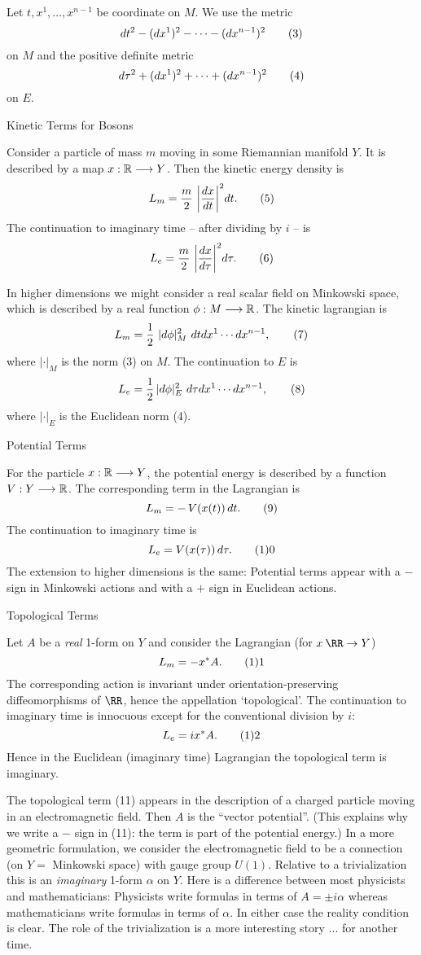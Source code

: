 Let $t,x^1,\ldots,x^{n-1}$ be coordinate on $M$.  We use the
metric
$$
dt^2-(dx^1)^2-\cdots-(dx^{n-1})^2\tag3
$$
on $M$ and the positive definite metric
$$
d\tau^2+(dx^1)^2+\cdots+(dx^{n-1})^2\tag4
$$
on $E$.
 
\subhead Kinetic Terms for Bosons\endsubhead
 
Consider a particle of mass $m$ moving in some Riemannian
manifold $Y$.  It is described by a map $x:\Bbb
R\longrightarrow Y$.  Then the kinetic energy density is
$$
L_m=\frac{m}{2}\,\,\bigg\vert\frac{dx}{dt}\bigg\vert^2dt.\tag5
$$
The continuation to imaginary time -- after dividing by
$i$ -- is 
$$
L_e=\frac{m}{2}\,\,\bigg\vert\frac{dx}{d\tau}
\bigg\vert^2d\tau.\tag6
$$
 
In higher dimensions we might consider a real scalar field
on Minkowski space, which is described by a real function
$\phi:M\longrightarrow\Bbb R$.  The kinetic lagrangian is 
$$
L_m=\frac{1}{2}\,\,|d\phi|^2_M\,\,dtdx^1\cdots
dx^{n-1},\tag7
$$
where $|\cdot|_M$ is the norm (3) on $M$.  The
continuation to $E$ is
$$
L_e=\frac{1}{2}\,|d\phi|^2_E\,\,d\tau dx^1\cdots
dx^{n-1},\tag8
$$
where $|\cdot|_E$ is the Euclidean norm (4).
 
\subhead Potential Terms\endsubhead
 
For the particle $x:\Bbb R\longrightarrow Y$, the potential
energy is described by a function $V:Y\longrightarrow\Bbb
R$.  The corresponding term in the Lagrangian is
$$
L_m=-\,V(x(t))\,dt.\tag9
$$
The continuation to imaginary time is
$$
L_e=V(x(\tau))\,d\tau.\tag10
$$
The extension to higher dimensions is the same:  Potential
terms appear with a $-$ sign in Minkowski actions and
with a $+$ sign in Euclidean actions.
 
\subhead Topological Terms\endsubhead
 
Let $A$ be a {\it real} 1-form on $Y$ and consider the
Lagrangian (for $x\:\RR\to Y$)
$$
L_m=-x^*A.\tag11
$$
The corresponding action is invariant under orientation-preserving
diffeomorphisms of $\RR$, hence the appellation `topological'.  The
continuation to imaginary time is innocuous except for the conventional
division by $i$:
$$
L_e=ix^*A.\tag12
$$
Hence in the Euclidean (imaginary time) Lagrangian the
topological term is imaginary.
 
The topological term (11) appears in the description of a charged particle
moving in an electromagnetic field.  Then $A$ is the ``vector potential''.
(This explains why we write a $-$ sign in (11): the term is part of the
potential energy.)  In a more geometric formulation, we consider the
electromagnetic field to be a connection (on $Y=$ Minkowski space) with gauge
group $U(1)$.  Relative to a trivialization this is an {\it imaginary} 1-form
$\alpha$ on $Y$.  Here is a difference between most physicists and
mathematicians: Physicists write formulas in terms of $A=\pm i\alpha$ whereas
mathematicians write formulas in terms of $\alpha$.  In either case the
reality condition is clear.  The role of the trivialization is a more
interesting story ... for another time.
 
